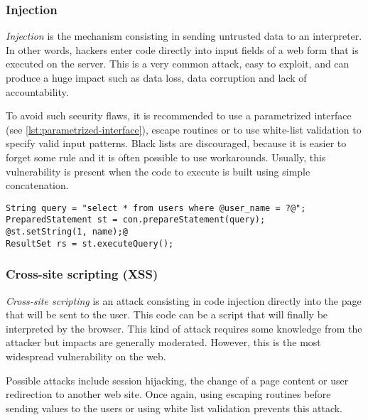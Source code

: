 \subsubsection{Injection}

\emph{Injection} is the mechanism consisting in sending untrusted data to an
interpreter. In other words, hackers enter code directly into input fields of
a web form that is executed on the server.
This is a very common attack, easy to exploit, and can produce a huge impact
such as data loss, data corruption and lack of accountability.


To avoid such security flaws, it is recommended to use a parametrized
interface (see \autoref{lst:parametrized-interface}), escape routines or to
use white-list validation to specify valid input patterns.
Black lists are discouraged, because it is easier to forget some rule and
it is often possible to use workarounds.
Usually, this vulnerability is present when the code to execute is built using
simple concatenation.

\begin{lstlisting}[style=beamer,
	caption={Parametrized interface in Java},
	label=lst:parametrized-interface]
String query = "select * from users where @user_name = ?@";
PreparedStatement st = con.prepareStatement(query);
@st.setString(1, name);@
ResultSet rs = st.executeQuery();
\end{lstlisting}

\subsubsection{Cross-site scripting (XSS)}

\emph{Cross-site scripting} is an attack consisting in code injection directly
into the page that will be sent to the user.
This code can be a script that will finally be interpreted by the browser.
This kind of attack requires some knowledge from the attacker but impacts are
generally moderated.
However, this is the most widespread vulnerability on the web.


Possible attacks include session hijacking, the change of a page content or
user redirection to another web site. Once again, using escaping routines
before sending values to the users or using white list validation prevents
this attack.

